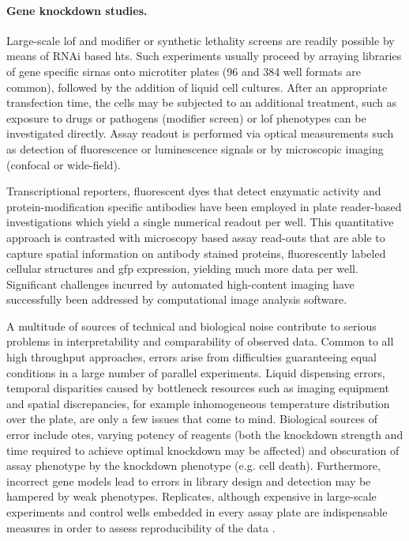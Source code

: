 \paragraph{Gene knockdown studies.}
Large-scale \gls{lof} and modifier or synthetic lethality screens are readily possible by means of RNAi based \gls{hts}. Such experiments usually proceed by arraying libraries of gene specific \glspl{sirna} onto microtiter plates (96 and 384 well formats are common), followed by the addition of liquid cell cultures. After an appropriate transfection time, the cells may be subjected to an additional treatment, such as exposure to drugs or pathogens (modifier screen) or \gls{lof} phenotypes can be investigated directly. Assay readout is performed via optical measurements such as detection of fluorescence or luminescence signals or by microscopic imaging (confocal or wide-field).

Transcriptional reporters, fluorescent dyes that detect enzymatic activity and protein-modification specific antibodies have been employed in plate reader-based investigations which yield a single numerical readout per well. This quantitative approach is contrasted with microscopy based assay read-outs that are able to capture spatial information on antibody stained proteins, fluorescently labeled cellular structures and \gls{gfp} expression, yielding much more data per well. Significant challenges incurred by automated high-content imaging have successfully been addressed by computational image analysis software.

A multitude of sources of technical and biological noise contribute to serious problems in interpretability and comparability of observed data. Common to all high throughput approaches, errors arise from difficulties guaranteeing equal conditions in a large number of parallel experiments. Liquid dispensing errors, temporal disparities caused by bottleneck resources such as imaging equipment and spatial discrepancies, for example inhomogeneous temperature distribution over the plate, are only a few issues that come to mind. Biological sources of error include \glspl{ote}, varying potency of reagents (both the knockdown strength and time required to achieve optimal knockdown may be affected) and obscuration of assay phenotype by the knockdown phenotype (e.g. cell death). Furthermore, incorrect gene models lead to errors in library design and detection may be hampered by weak phenotypes. Replicates, although expensive in large-scale experiments and control wells embedded in every assay plate are indispensable measures in order to assess reproducibility of the data \citep{Echeverri2006,Perrimon2007}.

